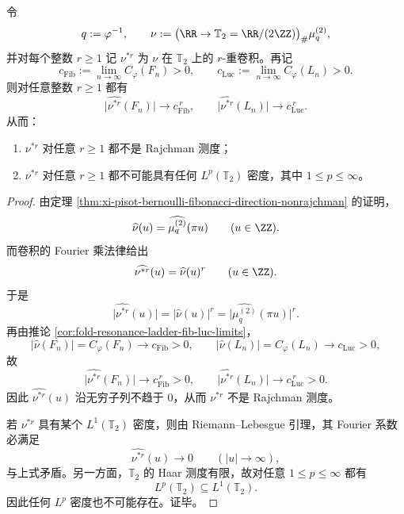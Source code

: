 \begin{theorem}\label{thm:xi-time-part59ab-periodized-bernoulli-no-finite-smoothing}
令
\[
q:=\varphi^{-1},
\qquad
\nu:=\bigl(\RR\to \mathbb T_2=\RR/(2\ZZ)\bigr)_\#\mu_q^{(2)},
\]
并对每个整数 \(r\ge 1\) 记 \(\nu^{*r}\) 为 \(\nu\) 在 \(\mathbb T_2\) 上的 \(r\)-重卷积。再记
\[
c_{\mathrm{Fib}}:=\lim_{n\to\infty}C_\varphi(F_n)>0,
\qquad
c_{\mathrm{Luc}}:=\lim_{n\to\infty}C_\varphi(L_n)>0.
\]
则对任意整数 \(r\ge 1\) 都有
\[
\boxed{\;
\bigl|\widehat{\nu^{*r}}(F_n)\bigr|\longrightarrow c_{\mathrm{Fib}}^{\,r},
\qquad
\bigl|\widehat{\nu^{*r}}(L_n)\bigr|\longrightarrow c_{\mathrm{Luc}}^{\,r}.\;}
\]
从而：
\begin{enumerate}
  \item \(\nu^{*r}\) 对任意 \(r\ge 1\) 都不是 Rajchman 测度；
  \item \(\nu^{*r}\) 对任意 \(r\ge 1\) 都不可能具有任何 \(L^p(\mathbb T_2)\) 密度，其中 \(1\le p\le\infty\)。
\end{enumerate}
\end{theorem}
\begin{proof}
由定理 \ref{thm:xi-pisot-bernoulli-fibonacci-direction-nonrajchman} 的证明，
\[
\widehat\nu(u)=\widehat{\mu_q^{(2)}}(\pi u)
\qquad (u\in\ZZ).
\]
而卷积的 Fourier 乘法律给出
\[
\widehat{\nu^{*r}}(u)=\widehat\nu(u)^r
\qquad (u\in\ZZ).
\]
于是
\[
\bigl|\widehat{\nu^{*r}}(u)\bigr|
=
\bigl|\widehat\nu(u)\bigr|^r
=
\bigl|\widehat{\mu_q^{(2)}}(\pi u)\bigr|^r.
\]
再由推论 \ref{cor:fold-resonance-ladder-fib-luc-limits}，
\[
\bigl|\widehat\nu(F_n)\bigr|=C_\varphi(F_n)\longrightarrow c_{\mathrm{Fib}}>0,
\qquad
\bigl|\widehat\nu(L_n)\bigr|=C_\varphi(L_n)\longrightarrow c_{\mathrm{Luc}}>0,
\]
故
\[
\bigl|\widehat{\nu^{*r}}(F_n)\bigr|\longrightarrow c_{\mathrm{Fib}}^{\,r}>0,
\qquad
\bigl|\widehat{\nu^{*r}}(L_n)\bigr|\longrightarrow c_{\mathrm{Luc}}^{\,r}>0.
\]
因此 \(\widehat{\nu^{*r}}(u)\) 沿无穷子列不趋于 \(0\)，从而 \(\nu^{*r}\) 不是 Rajchman 测度。

若 \(\nu^{*r}\) 具有某个 \(L^1(\mathbb T_2)\) 密度，则由 Riemann--Lebesgue 引理，其 Fourier 系数必满足
\[
\widehat{\nu^{*r}}(u)\longrightarrow 0
\qquad (|u|\to\infty),
\]
与上式矛盾。另一方面，\(\mathbb T_2\) 的 Haar 测度有限，故对任意 \(1\le p\le\infty\) 都有
\[
L^p(\mathbb T_2)\subseteq L^1(\mathbb T_2).
\]
因此任何 \(L^p\) 密度也不可能存在。证毕。
\end{proof}

